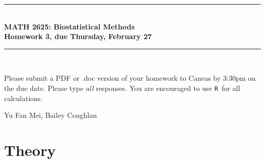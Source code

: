 \documentclass{article}
\newcommand{\HRule}{\rule{\linewidth}{0.5mm}}
\newcommand{\R}{\texttt{R}}
\begin{document}
	\begin{center}
		\HRule \\[0.1cm]
		\vspace{0.1cm}
		{ \LARGE \bfseries MATH 2625: Biostatistical Methods\\[0.5cm] Homework 3, due Thursday, February 27 } \\[0.1cm]
		\HRule \\[0.1cm]
	\end{center}
	
	Please submit a PDF or .doc version of your homework to Canvas by 3:30pm on the due date. Please type \emph{all} responses. You are encouraged to use \R\ for all calculations.

	Yu Fan Mei, Bailey Coughlan
		
	\section*{Theory}
\end{document}
